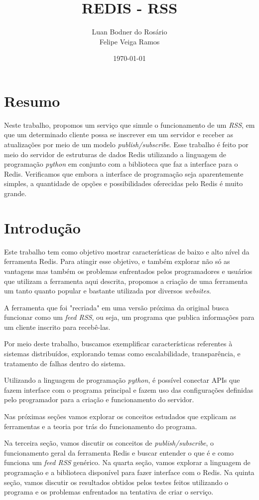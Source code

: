\documentclass[10pt]{IEEEtran}
\title{REDIS - RSS}
\author{Luan Bodner do Rosário \\ Felipe Veiga Ramos}
\date{\today}
\begin{document}
\maketitle

\section{Resumo}

Neste trabalho, propomos um serviço que simule o funcionamento de um \textit{RSS}, em que um determinado cliente possa se inscrever em um servidor e receber as atualizações por meio de um modelo \textit{publish/subscribe}. Esse trabalho é feito por meio do servidor de estruturas de dados Redis utilizando a linguagem de programação \textit{python} em conjunto com a biblioteca que faz a interface para o Redis. Verificamos que embora a interface de programação seja aparentemente simples, a quantidade de opções e possibilidades oferecidas pelo Redis é muito grande.

\section{Introdução}
Este trabalho tem como objetivo mostrar características de baixo e alto nível da ferramenta Redis. Para atingir esse objetivo, e também explorar não só as vantagens mas também os problemas enfrentados pelos programadores e usuários que utilizam a ferramenta aqui descrita, propomos a criação de uma ferramenta um tanto quanto popular e bastante utilizada por diversos \textit{websites}.

A ferramenta que foi "recriada" em uma versão próxima da original busca funcionar como um \textit{feed RSS}, ou seja, um programa que publica informações para um cliente inscrito para recebê-las.

Por meio deste trabalho, buscamos exemplificar características referentes à sistemas distribuídos, explorando temas como escalabilidade, transparência, e tratamento de falhas dentro do sistema.

Utilizando a linguagem de programação \textit{python}, é possível conectar APIs que fazem interface com o programa principal e fazem uso das configurações definidas pelo programador para a criação e funcionamento do servidor.

Nas próximas seções vamos explorar os conceitos estudados que explicam as ferramentas e a teoria por trás do funcionamento do programa. 

Na terceira seção, vamos discutir os conceitos de \textit{publish/subscribe}, o funcionamento geral da ferramenta Redis e buscar entender o que é e como funciona um \textit{feed RSS} genérico. Na quarta seção, vamos explorar a linguagem de programação e a biblioteca disponível para fazer interface com o Redis. Na quinta seção, vamos discutir os resultados obtidos pelos testes feitos utilizando o programa e os problemas enfrentados na tentativa de criar o serviço. 
\end{document}
